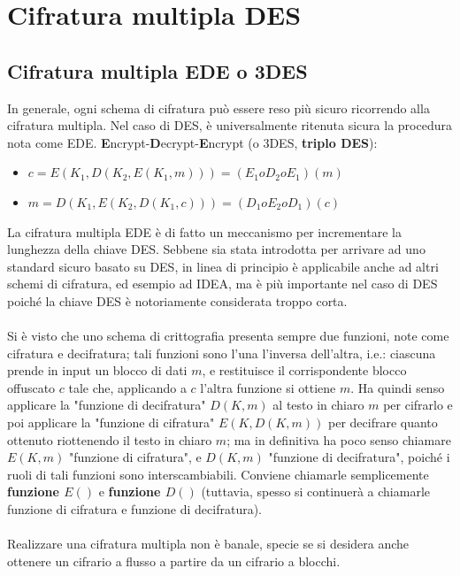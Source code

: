 \section{Cifratura multipla DES}
\subsection{Cifratura multipla EDE o 3DES}
In generale, ogni schema di cifratura può essere reso più sicuro ricorrendo alla cifratura multipla.
Nel caso di DES, è universalmente ritenuta sicura la procedura nota come EDE.
\textbf{E}ncrypt-\textbf{D}ecrypt-\textbf{E}ncrypt (o 3DES, \textbf{triplo DES}):
\begin{itemize}
\item $c = E(K_{1},D(K_{2},E(K_{1},m))) = (E_{1} o D_{2} o E_{1})(m)$
\item $m = D(K_{1},E(K_{2},D(K_{1},c))) = (D_{1} o E_{2} o D_{1})(c)$
\end{itemize}
La cifratura multipla EDE è di fatto un meccanismo per incrementare la lunghezza della chiave DES. Sebbene sia stata introdotta per arrivare ad uno standard sicuro basato su DES, in linea di principio è applicabile anche ad altri schemi
di cifratura, ed esempio ad IDEA, ma è più importante nel caso di DES poiché la chiave DES è notoriamente considerata troppo corta.\\ \\
Si è visto che uno schema di crittografia presenta sempre due funzioni, note come cifratura e decifratura; tali funzioni sono l'una l'inversa dell'altra, i.e.: ciascuna prende in input un blocco di dati $m$, e restituisce il corrispondente blocco offuscato $c$ tale che, applicando a $c$ l'altra funzione si ottiene $m$. Ha quindi senso applicare la "funzione di decifratura" $D(K, m)$ al testo in chiaro $m$ per cifrarlo e poi applicare la "funzione di cifratura" $E(K, D(K, m))$ per decifrare quanto ottenuto riottenendo il testo in chiaro $m$; ma in definitiva ha poco senso chiamare $E(K, m)$ "funzione di cifratura", e $D(K, m)$ "funzione di decifratura", poiché i ruoli di tali funzioni sono interscambiabili. Conviene chiamarle semplicemente \textbf{funzione $E()$} e \textbf{funzione $D()$} (tuttavia, spesso si continuerà a chiamarle funzione di cifratura e funzione di decifratura).\\ \\
Realizzare una cifratura multipla non è banale, specie se si desidera anche ottenere un cifrario a flusso a partire da un cifrario a blocchi. \\
